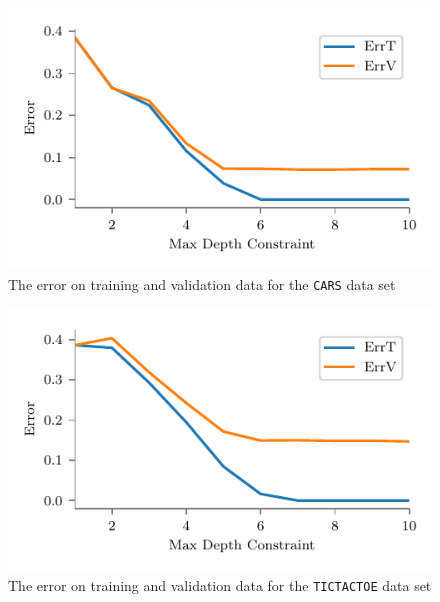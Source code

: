 \documentclass[screen, authorversion, nonacm, sigconf]{acmart}
\begin{document}
\begin{figure}[h]
  \centering
  \includegraphics[width=\columnwidth]{figures/chart_errt_errv_car_ours.pdf}
  \caption{The error on training and validation data for the \texttt{CARS} data set}
  \label{fig:mushroomserrterrv}
\end{figure}

\begin{figure}[h]
  \centering
  \includegraphics[width=\columnwidth]{figures/chart_errt_errv_tictactoe_ours.pdf}
  \caption{The error on training and validation data for the \texttt{TICTACTOE} data set}
  \label{fig:mushroomserrterrv}
\end{figure}
\end{document}
